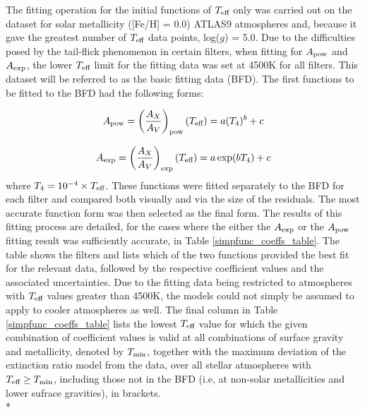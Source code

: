 \documentclass[12pt, a4paper]{report}
\begin{document}
The fitting operation for the initial functions of $T_{\textnormal{eff}}$ only was carried out on the dataset for solar metallicity ([Fe/H] = 0.0) ATLAS9 atmospheres and, because it gave the greatest number of $T_{\textnormal{eff}}$ data points, log($g$) = 5.0. Due to the difficulties posed by the tail-flick phenomenon in certain filters, when fitting for $A_{\textnormal{pow}}$ and $A_{\textnormal{exp}}$, the lower $T_{\textnormal{eff}}$ limit for the fitting data was set at 4500K for all filters. This dataset will be referred to as the basic fitting data (BFD). The first functions to be fitted to the BFD had the following forms:

\begin{equation}
A_{\textnormal{pow}} = \left(\frac{A_{X}}{A_{V}}\right)_{\textnormal{pow}}(T_{\textnormal{eff}}) = a (T_{4})^{b} + c
\label{Teff_pow}
\end{equation}

\begin{equation}
A_{\textnormal{exp}} = \left(\frac{A_{X}}{A_{V}}\right)_{\textnormal{exp}} (T_{\textnormal{eff}}) = a \exp(b T_{4}) + c
\label{Teff_exp}
\end{equation}
where $T_{4} = 10^{-4} \times T_{\textnormal{eff}}$. These functions were fitted separately to the BFD for each filter and compared both visually and via the size of the residuals. The most accurate function form was then selected as the final form. The results of this fitting process are detailed, for the cases where the either the $A_{\textnormal{exp}}$ or the $A_{\textnormal{pow}}$ fitting result was sufficiently accurate, in Table \ref{simpfunc_coeffs_table}. The table shows the filters and lists which of the two functions provided the best fit for the relevant data, followed by the respective coefficient values and the associated uncertainties. Due to the fitting data being restricted to atmospheres with $T_{\textnormal{eff}}$ values greater than 4500K, the models could not simply be assumed to apply to cooler atmospheres as well. The final column in Table \ref{simpfunc_coeffs_table} lists the lowest $T_{\textnormal{eff}}$ value for which the given combination of coefficient values is valid at all combinations of surface gravity and metallicity, denoted by $T_{\textnormal{min}}$, together with the maximum deviation of the extinction ratio model from the data, over all stellar atmospheres with $T_{\textnormal{eff}} \geq T_{\textnormal{min}}$, including those not in the BFD (i.e, at non-solar metallicities and lower sufrace gravities), in brackets. \\*
\end{document}
